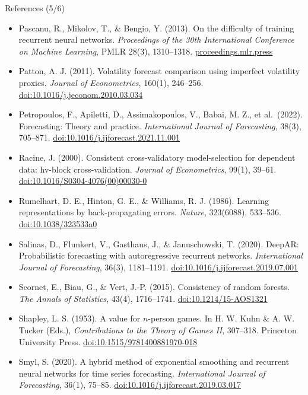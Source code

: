 \begin{frame}{References (5/6)}
\itemsize{\tiny}
\begin{itemize}
    \item Pascanu, R., Mikolov, T., \& Bengio, Y. (2013). On the difficulty of training recurrent neural networks. \textit{Proceedings of the 30th International Conference on Machine Learning}, PMLR 28(3), 1310--1318. \href{https://proceedings.mlr.press/v28/pascanu13.html}{proceedings.mlr.press}
    \item Patton, A. J. (2011). Volatility forecast comparison using imperfect volatility proxies. \textit{Journal of Econometrics}, 160(1), 246--256. \href{https://doi.org/10.1016/j.jeconom.2010.03.034}{doi:10.1016/j.jeconom.2010.03.034}
    \item Petropoulos, F., Apiletti, D., Assimakopoulos, V., Babai, M. Z., et al.\ (2022). Forecasting: Theory and practice. \textit{International Journal of Forecasting}, 38(3), 705--871. \href{https://doi.org/10.1016/j.ijforecast.2021.11.001}{doi:10.1016/j.ijforecast.2021.11.001}
    \item Racine, J. (2000). Consistent cross-validatory model-selection for dependent data: hv-block cross-validation. \textit{Journal of Econometrics}, 99(1), 39--61. \href{https://doi.org/10.1016/S0304-4076(00)00030-0}{doi:10.1016/S0304-4076(00)00030-0}
    \item Rumelhart, D. E., Hinton, G. E., \& Williams, R. J. (1986). Learning representations by back-propagating errors. \textit{Nature}, 323(6088), 533--536. \href{https://doi.org/10.1038/323533a0}{doi:10.1038/323533a0}
    \item Salinas, D., Flunkert, V., Gasthaus, J., \& Januschowski, T. (2020). DeepAR: Probabilistic forecasting with autoregressive recurrent networks. \textit{International Journal of Forecasting}, 36(3), 1181--1191. \href{https://doi.org/10.1016/j.ijforecast.2019.07.001}{doi:10.1016/j.ijforecast.2019.07.001}
    \item Scornet, E., Biau, G., \& Vert, J.-P. (2015). Consistency of random forests. \textit{The Annals of Statistics}, 43(4), 1716--1741. \href{https://doi.org/10.1214/15-AOS1321}{doi:10.1214/15-AOS1321}
    \item Shapley, L. S. (1953). A value for $n$-person games. In H. W. Kuhn \& A. W. Tucker (Eds.), \textit{Contributions to the Theory of Games II}, 307--318. Princeton University Press. \href{https://doi.org/10.1515/9781400881970-018}{doi:10.1515/9781400881970-018}
    \item Smyl, S. (2020). A hybrid method of exponential smoothing and recurrent neural networks for time series forecasting. \textit{International Journal of Forecasting}, 36(1), 75--85. \href{https://doi.org/10.1016/j.ijforecast.2019.03.017}{doi:10.1016/j.ijforecast.2019.03.017}

\end{itemize}
\end{frame}
